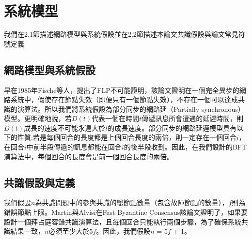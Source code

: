 \chapter{系統模型}\label{se_2}
我們在2.1節描述網路模型與系統假設並在2.2節描述本論文共識假設與論文常見符號定義
\section{網路模型與系統假設}\label{se_2} 

早在1985年Fische等人，提出了FLP不可能證明\cite{fischer1982impossibility}，該論文證明在一個完全異步的網路系統中，假使存在節點失效（即便只有一個節點失效），不存在一個可以達成共識的演算法。所以我們將系統假設為部分同步的網路延（Partially synchronous）模型。更明確地說，若$D(t)$代表一個在時間$t$傳遞訊息所會遭遇的延遲時間，則$D(t)$成長的速度不可能永遠大於$t$的成長速度。部分同步的網路延遲模型具有以下的性質:若是每個回合的長度都是上個回合長度的兩倍，則一定存在一個回合$i$，在回合$i$中前半段傳遞的訊息都能在回合$i$的後半段收到。因此，在我們設計的BFT演算法中，每個回合的長度會是前一個回合長度的兩倍。

\section{共識假設與定義}\label{se_2} 

我們假設$n$為共識問題中的參與共識的總節點數量（包含故障節點的數量），$f$則為錯誤節點上限。Martin與Alvisi在Fast Byzantine Consensus該論文\cite{martin2006fast}證明了，如果要設計一個拜占庭容錯共識演算法，且每個回合只能執行兩個步驟，為了確保系統共識結果一致，$n$必須至少大於5$f$。因此，我們假設$n$ = 5$f$ + 1。

